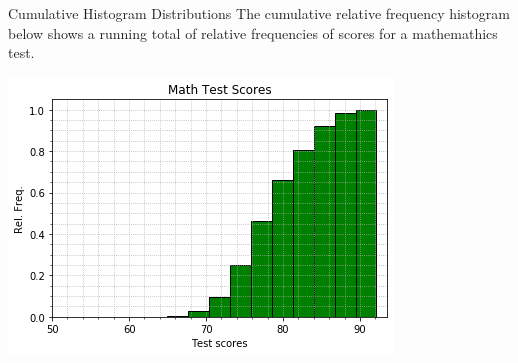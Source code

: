 \documentclass[t]{beamer}
\begin{document}
\begin{frame}{Cumulative Histogram Distributions}
The cumulative relative frequency histogram below shows a running total of relative frequencies of scores for a mathemathics test.
\begin{center}
\includegraphics[scale=0.6]{../Images/cumulative_hist.png}
\end{center}
\end{frame}
\end{document}
